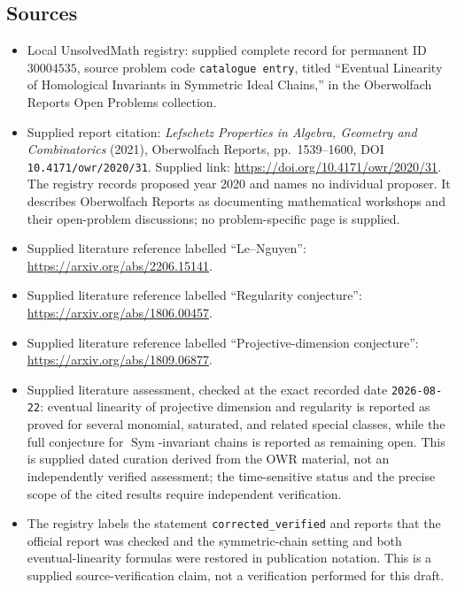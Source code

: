 \documentclass[11pt]{article}
\begin{document}
\subsection{Sources}
\begin{itemize}
\item Local UnsolvedMath registry: supplied complete record for permanent ID \(30004535\), source problem code \texttt{catalogue entry}, titled ``Eventual Linearity of Homological Invariants in Symmetric Ideal Chains,'' in the Oberwolfach Reports Open Problems collection.
\item Supplied report citation: \emph{Lefschetz Properties in Algebra, Geometry and Combinatorics} (2021), Oberwolfach Reports, pp.\ 1539--1600, DOI \texttt{10.4171/owr/2020/31}. Supplied link: \url{https://doi.org/10.4171/owr/2020/31}. The registry records proposed year 2020 and names no individual proposer. It describes Oberwolfach Reports as documenting mathematical workshops and their open-problem discussions; no problem-specific page is supplied.
\item Supplied literature reference labelled ``Le--Nguyen'': \url{https://arxiv.org/abs/2206.15141}.
\item Supplied literature reference labelled ``Regularity conjecture'': \url{https://arxiv.org/abs/1806.00457}.
\item Supplied literature reference labelled ``Projective-dimension conjecture'': \url{https://arxiv.org/abs/1809.06877}.
\item Supplied literature assessment, checked at the exact recorded date \texttt{2026-08-22}: eventual linearity of projective dimension and regularity is reported as proved for several monomial, saturated, and related special classes, while the full conjecture for \(\operatorname{Sym}\)-invariant chains is reported as remaining open. This is supplied dated curation derived from the OWR material, not an independently verified assessment; the time-sensitive status and the precise scope of the cited results require independent verification.
\item The registry labels the statement \texttt{corrected\_verified} and reports that the official report was checked and the symmetric-chain setting and both eventual-linearity formulas were restored in publication notation. This is a supplied source-verification claim, not a verification performed for this draft.
\end{itemize}
\end{document}

